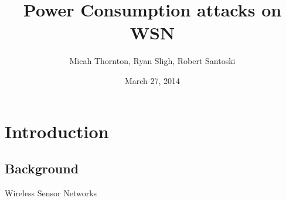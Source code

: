 \documentclass{beamer}
\title[Power Consumption Attacks on Wireless Sensor Networks]{Power Consumption attacks on WSN}
\author{Micah Thornton, Ryan Sligh, Robert Santoski}
\institute{Southern Methodist University}
\date{March 27, 2014}
\begin{document}
\begin{frame}
\titlepage
\end{frame}

{
\centering
{}
\begin{frame}[plain]
\end{frame}
}


\begin{frame}
\tableofcontents
\end{frame}

\section{Introduction}
\subsection{Background}

\begin{frame}{Wireless Sensor Networks}

\end{frame}
\end{document}
